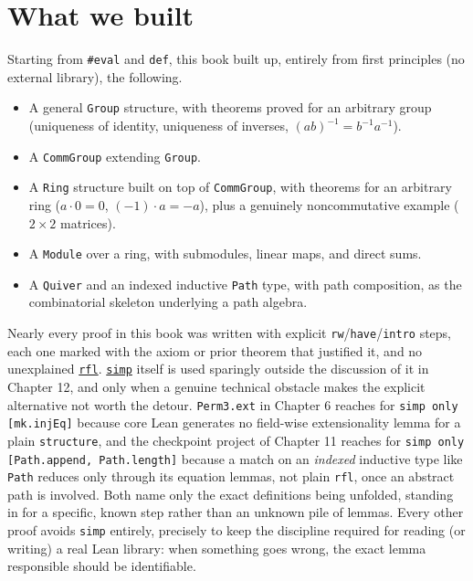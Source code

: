 \section{What we built}\label{sec:13-next-steps:01-what-we-built:1}

Starting from \texttt{\#eval} and \texttt{def}, this book built up, entirely from first principles (no external library), the following.

\begin{itemize}
\tightlist
\item
  A general \texttt{Group} structure, with theorems proved for an arbitrary group (uniqueness of identity, uniqueness of inverses, \((ab)^{-1} = b^{-1}a^{-1}\)).
\item
  A \texttt{CommGroup} extending \texttt{Group}.
\item
  A \texttt{Ring} structure built on top of \texttt{CommGroup}, with theorems for an arbitrary ring (\(a \cdot 0 = 0\), \((-1)\cdot a = -a\)), plus a genuinely noncommutative example (\(2\times 2\) matrices).
\item
  A \texttt{Module} over a ring, with submodules, linear maps, and direct sums.
\item
  A \texttt{Quiver} and an indexed inductive \texttt{Path} type, with path composition, as the combinatorial skeleton underlying a path algebra.
\end{itemize}

Nearly every proof in this book was written with explicit \texttt{rw}/\texttt{have}/\texttt{intro} steps, each one marked with the axiom or prior theorem that justified it, and no unexplained \href{https://lean-lang.org/doc/reference/latest/Tactic-Proofs/Tactic-Reference/}{\texttt{rfl}}. \href{https://lean-lang.org/doc/reference/latest/Tactic-Proofs/Tactic-Reference/}{\texttt{simp}} itself is used sparingly outside the discussion of it in Chapter 12, and only when a genuine technical obstacle makes the explicit alternative not worth the detour. \texttt{Perm3.ext} in Chapter 6 reaches for \texttt{simp only [mk.injEq]} because core Lean generates no field-wise extensionality lemma for a plain \texttt{structure}, and the checkpoint project of Chapter 11 reaches for \texttt{simp only [Path.append, Path.length]} because a match on an \emph{indexed} inductive type like \texttt{Path} reduces only through its equation lemmas, not plain \texttt{rfl}, once an abstract path is involved. Both name only the exact definitions being unfolded, standing in for a specific, known step rather than an unknown pile of lemmas. Every other proof avoids \texttt{simp} entirely, precisely to keep the discipline required for reading (or writing) a real Lean library: when something goes wrong, the exact lemma responsible should be identifiable.
